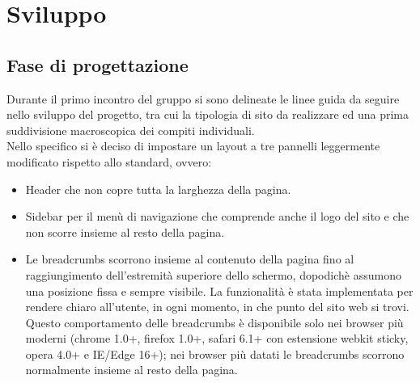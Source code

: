 \section{Sviluppo}

\vspace{8px}

\subsection{Fase di progettazione}
Durante il primo incontro del gruppo si sono delineate le linee guida da seguire nello sviluppo del progetto, tra cui la tipologia di sito da realizzare ed una prima suddivisione macroscopica dei compiti individuali.\\
Nello specifico si è deciso di impostare un layout a tre pannelli leggermente modificato rispetto allo standard, ovvero:
\begin{itemize}
 \item Header che non copre tutta la larghezza della pagina.
 \item Sidebar per il menù di navigazione che comprende anche il logo del sito e che non scorre insieme al resto della pagina.
 \item Le breadcrumbs scorrono insieme al contenuto della pagina fino al raggiungimento dell'estremità superiore dello schermo, dopodichè assumono una posizione fissa e sempre visibile. La funzionalità è stata implementata per rendere chiaro all'utente, in ogni momento, in che punto del sito web si trovi. Questo comportamento delle breadcrumbs è disponibile solo nei browser più moderni (chrome 1.0+, firefox 1.0+, safari 6.1+ con estensione webkit sticky, opera 4.0+ e IE/Edge 16+); nei browser più datati le breadcrumbs scorrono normalmente insieme al resto della pagina.
\end{itemize}

\vspace{8px}

